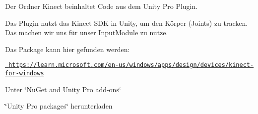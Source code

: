 Der Ordner Kinect beinhaltet Code aus dem Unity Pro Plugin.

Das Plugin nutzt das Kinect SDK in Unity, um den Körper (Joints) zu tracken. Das machen wir uns für unser Input\+Module zu nutze.

Das Package kann hier gefunden werden\+:
\begin{DoxyItemize}
\item \href{https://learn.microsoft.com/en-us/windows/apps/design/devices/kinect-for-windows}{\texttt{ https\+://learn.\+microsoft.\+com/en-\/us/windows/apps/design/devices/kinect-\/for-\/windows}}
\item Unter \char`\"{}\+Nu\+Get and Unity Pro add-\/ons\char`\"{}
\item \char`\"{}\+Unity Pro packages\char`\"{} herunterladen 
\end{DoxyItemize}